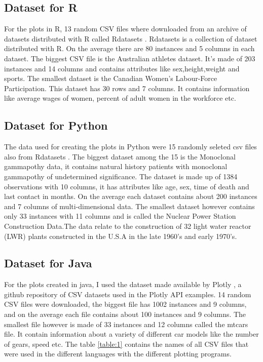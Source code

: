 \documentclass[12pt, a4paper,oneside]{report}
\begin{document}
\subsection{Dataset for R}
For the plots in R, 13 random CSV files where downloaded from an archive of datasets distributed with R called Rdatasets  \cite{rdata}. Rdatasets is a collection of dataset distributed with R. On the average there are 80 instances and 5 columns in each dataset.
The biggest CSV file is the Australian athletes dataset. It's made of 203 instances and 14 columns and contains attributes like sex,height,weight and sports. The smallest dataset is the Canadian Women's Labour-Force Participation. This dataset has 30 rows and 7 columns. It contains information like average wages of women, percent of adult women in the workforce etc.


\subsection{Dataset for Python}
The data used for creating the plots in Python were 15 randomly seleted csv files also from  Rdatasets \cite{rdata}. The biggest dataset among the 15 is the Monoclonal gammapothy data, it contains natural history patients with monoclonal gammapothy of undetermined significance. The dataset is made up of 1384 observations with 10 columns, it has attributes like age, sex, time of death and last contact in months. On the average each dataset contains about 200 instances and 7 columns of multi-dimensional data. The smallest dataset however contains only 33 instances with 11 columns and is called the Nuclear Power Station Construction Data.The data relate to the construction of 32 light water reactor (LWR) plants constructed in the U.S.A in the late 1960's and early 1970's.

\subsection{Dataset for Java}
For the plots created in java, I used the dataset made available by Plotly \cite{plotly}, a github repository of CSV datasets used in the Plotly API examples. 14 random CSV files were downloaded, the biggest file has 1002 instances and 9 columns, and on the average each file contains about 100 instances and 9 columns. The smallest file however is made of 33 instances and 12 columns called the mtcars file. It contain information about a variety of different car models like the number of gears, speed etc. The table \ref{table:1} contains the names of all CSV files that were used in the different languages with the different plotting programs.
\end{document}
